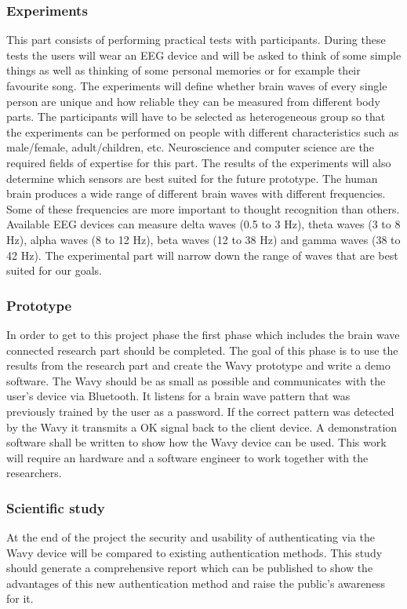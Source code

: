 \subsubsection{Experiments}
This part consists of performing practical tests with participants. During these tests the users will wear an EEG device and will be asked to think of some simple things as well as thinking of some personal memories or for example their favourite song. 
The experiments will define whether brain waves of every single person are unique and how reliable they can be measured from different body parts. The participants will have to be selected as heterogeneous group so that the experiments can be performed on people with different characteristics such as male/female, adult/children, etc. Neuroscience and computer science are the required fields of expertise for this part. The results of the experiments will also determine which sensors are best suited for the future prototype. The human brain produces a wide range of different brain waves with different frequencies. Some of these frequencies are more important to thought recognition than others. Available EEG devices can measure delta waves (0.5 to 3 Hz), theta waves (3 to 8 Hz), alpha waves (8 to 12 Hz), beta waves (12 to 38 Hz) and gamma waves (38 to 42 Hz). The experimental part will narrow down the range of waves that are best suited for our goals.

\subsubsection{Prototype}
In order to get to this project phase the first phase which includes the brain wave connected research part should be completed. The goal of this phase is to use the results from the research part and create the Wavy prototype and write a demo software. The Wavy should be as small as possible and communicates with the user's device via Bluetooth. It listens for a brain wave pattern that was previously trained by the user as a password. If the correct pattern was detected by the Wavy it transmits a OK signal back to the client device. A demonstration software shall be written to show how the Wavy device can be used. This work will require an hardware and a software engineer to work together with the researchers.

\subsubsection{Scientific study}
At the end of the project the security and usability of authenticating via the Wavy device will be compared to existing authentication methods. This study should generate a comprehensive report which can be published to show the advantages of this new authentication method and raise the public's awareness for it.

